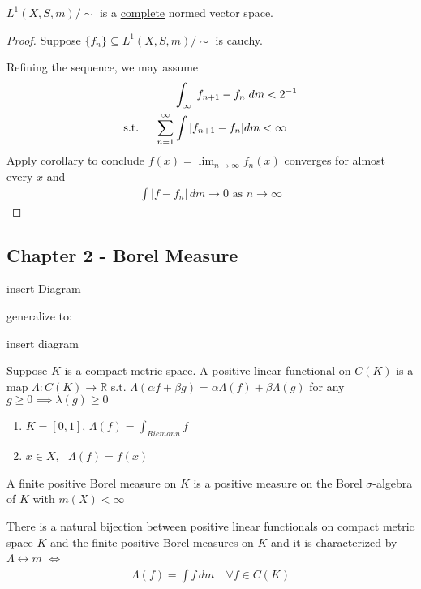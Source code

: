 \begin{corollary}
	$L^{1}(X,S, m) / \sim$ is a \underline{complete} normed vector space.
\end{corollary}

\begin{proof}
	Suppose $\{f_n\} \subseteq L^{1}(X,S, m) / \sim$ is cauchy.

	Refining the sequence, we may assume
	\begin{align*}
	&\int_{\infty}|f_{n+1} - f_{n} | dm < 2^{-1} \\ \text{s.t. \quad}
		\sum_{n=1}^{\infty} &\int | f_{n+1} - f_{n} | dm < \infty
	\end{align*}
	Apply corollary to conclude $f(x) = \lim_{n \to \infty} f_{n}(x)$ converges for almost every $x$ and
	\begin{align*}
		\int |f - f_{n} | \, dm \to 0 \text{ as } n \to \infty
	\end{align*}
\end{proof}


\subsection{Chapter 2 - Borel Measure}

insert Diagram


generalize to:

insert diagram

\begin{definition}
	Suppose $K$ is a compact metric space. A positive linear functional on $C(K)$ is a map $\Lambda : C(K) \to \mathbb{R}$ s.t.
	$\Lambda(\alpha f + \beta g) = \alpha \Lambda(f) + \beta\Lambda(g)$ for any
	$g \geq 0 \implies \lambda (g) \geq 0$
\end{definition}

\begin{example}
	\begin{enumerate}
		\item $K = [0,1]$, $\Lambda (f) = \int_{Riemann} f$
		\item $x \in X$, \, $\Lambda(f) = f(x)$
	\end{enumerate}
\end{example}

A finite positive Borel measure on $K$ is a positive measure on the Borel $\sigma$-algebra of $K$ with $m(X) < \infty$


\begin{theorem}
	There is a natural bijection between positive linear functionals on compact metric space $K$ and the finite positive Borel measures on $K$ and it is characterized by $\Lambda \leftrightarrow m$
	$\iff$
	 \begin{align*}
	\Lambda(f) = \int f \, dm \quad \forall f \in C(K)
	\end{align*}
\end{theorem}

